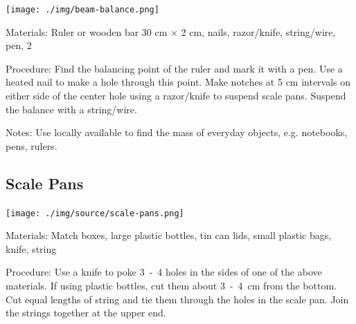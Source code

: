 \begin{multicols}{2}
\begin{center}
\texttt{[image: ./img/beam-balance.png]}
\end{center}

\begin{description*}
\item[Materials:]{Ruler or wooden bar 30 cm $\times$ 2 cm, nails, razor/knife, string/wire, pen, 2 }
\item[Procedure:]{Find the balancing point of the ruler and mark it with a pen. Use a heated nail to make a hole through this point. Make notches at 5 cm intervals on either side of the center hole using a razor/knife to suspend scale pans. Suspend the balance with a string/wire.}
\item[Notes:]{Use locally available  to find the mass of everyday objects, e.g. notebooks, pens, rulers.}
\end{description*}

\columnbreak

\subsection{Scale Pans}
\label{sub:scalepans}

\begin{center}
\texttt{[image: ./img/source/scale-pans.png]}
\end{center}

\begin{description*}
\item[Materials:]{Match boxes, large plastic bottles, tin can lids, small plastic bags, knife, string}
\item[Procedure:]{Use a knife to poke 3~-~4 holes in the sides of one of the above materials. If using plastic bottles, cut them about 3~-~4~cm from the bottom. Cut equal lengths of string and tie them through the holes in the scale pan. Join the strings together at the upper end. }
\end{description*}


\end{multicols}
